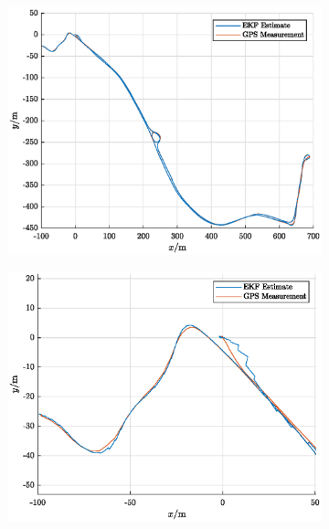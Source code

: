 \documentclass[11pt,a4paper]{article}
\begin{document}
	\begin{figure}[htp]
	    \centering
	    \begin{subfigure}[b]{0.48\textwidth}
	        \includegraphics[width=\textwidth]{figures/ekf_estimate.eps}
	    \end{subfigure}
	    \begin{subfigure}[b]{0.48\textwidth}
	        \includegraphics[width=\textwidth]{figures/ekf_estimate_zoom.eps}
	    \end{subfigure}
	    

\end{figure}
\end{document}
